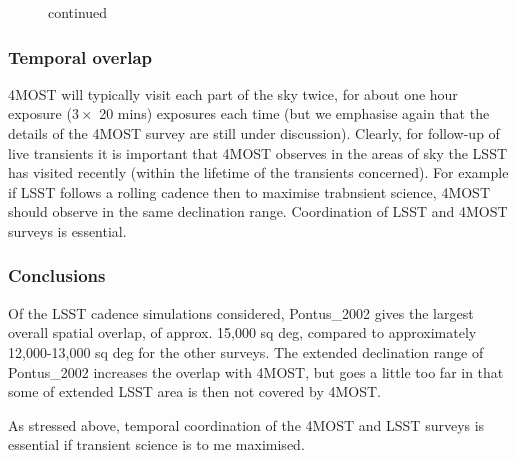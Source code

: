 \documentclass[a4paper,10pt]{article}
\begin{document}
\begin{figure}[htc]
\begin{tabular}{cc}
  \end{tabular}
  \caption{continued}
\end{figure}


\subsubsection{Temporal overlap}

4MOST will typically visit each part of the sky twice, for about one
hour exposure ($3\times$ 20 mins) exposures each time (but we
emphasise again that the details of the 4MOST survey are still under
discussion). Clearly, for follow-up of live transients it is important
that 4MOST observes in the areas of sky the LSST has visited recently
(within the lifetime of the transients concerned). For example if LSST
follows a rolling cadence then to maximise trabnsient science, 4MOST
should observe in the same declination range.  Coordination of LSST
and 4MOST surveys is essential.
 	 

\subsubsection{Conclusions}

Of the LSST cadence simulations considered, Pontus\_2002 gives the
largest overall spatial overlap, of approx. 15,000 sq deg, compared to
approximately 12,000-13,000 sq deg for the other surveys. The extended
declination range of Pontus\_2002 increases the overlap with 4MOST,
but goes a little too far in that some of extended LSST area is then
not covered by 4MOST.

As stressed above, temporal coordination of the 4MOST and LSST surveys is
essential if transient science is to me maximised.
\end{document}
